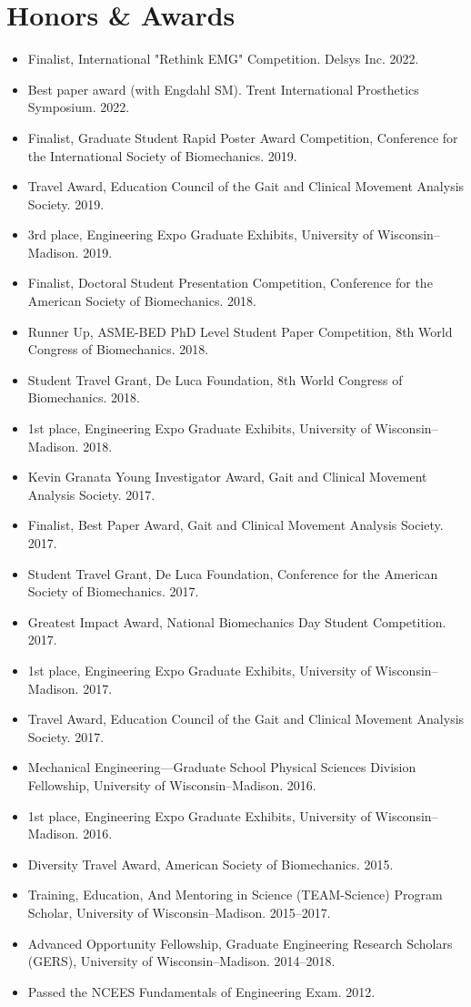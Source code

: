 \documentclass[letterpaper, 10pt]{article}
\begin{document}
\section{Honors \& Awards}
\begin{itemize}
    \item Finalist, International "Rethink EMG" Competition. Delsys Inc. 2022.
    \item Best paper award (with Engdahl SM). Trent International Prosthetics Symposium. 2022.
    \item Finalist, Graduate Student Rapid Poster Award Competition, Conference for the International Society of Biomechanics. 2019.
    \item Travel Award, Education Council of the Gait and Clinical Movement Analysis Society. 2019.
    \item 3rd place, Engineering Expo Graduate Exhibits, University of Wisconsin--Madison. 2019.
    \item Finalist, Doctoral Student Presentation Competition, Conference for the American Society of Biomechanics. 2018.
    \item Runner Up, ASME-BED PhD Level Student Paper Competition, 8th World Congress of Biomechanics. 2018.
    \item Student Travel Grant, De Luca Foundation, 8th World Congress of Biomechanics. 2018. 
    \item 1st place, Engineering Expo Graduate Exhibits, University of Wisconsin--Madison. 2018.
    \item Kevin Granata Young Investigator Award, Gait and Clinical Movement Analysis Society. 2017. 
    \item Finalist, Best Paper Award, Gait and Clinical Movement Analysis Society. 2017.
    \item Student Travel Grant, De Luca Foundation, Conference for the American Society of Biomechanics. 2017.
    \item Greatest Impact Award, National Biomechanics Day Student Competition. 2017. 
    \item 1st place, Engineering Expo Graduate Exhibits, University of Wisconsin--Madison. 2017. 
    \item Travel Award, Education Council of the Gait and Clinical Movement Analysis Society. 2017.
    \item Mechanical Engineering---Graduate School Physical Sciences Division Fellowship, University of Wisconsin--Madison. 2016.
    \item 1st place, Engineering Expo Graduate Exhibits, University of Wisconsin--Madison. 2016.
    \item Diversity Travel Award, American Society of Biomechanics. 2015. 
    \item Training, Education, And Mentoring in Science (TEAM-Science) Program Scholar, University of Wisconsin--Madison. 2015--2017.
    \item Advanced Opportunity Fellowship, Graduate Engineering Research Scholars (GERS), University of Wisconsin--Madison. 2014--2018.
    \item Passed the NCEES Fundamentals of Engineering Exam. 2012.
\end{itemize}
\end{document}
